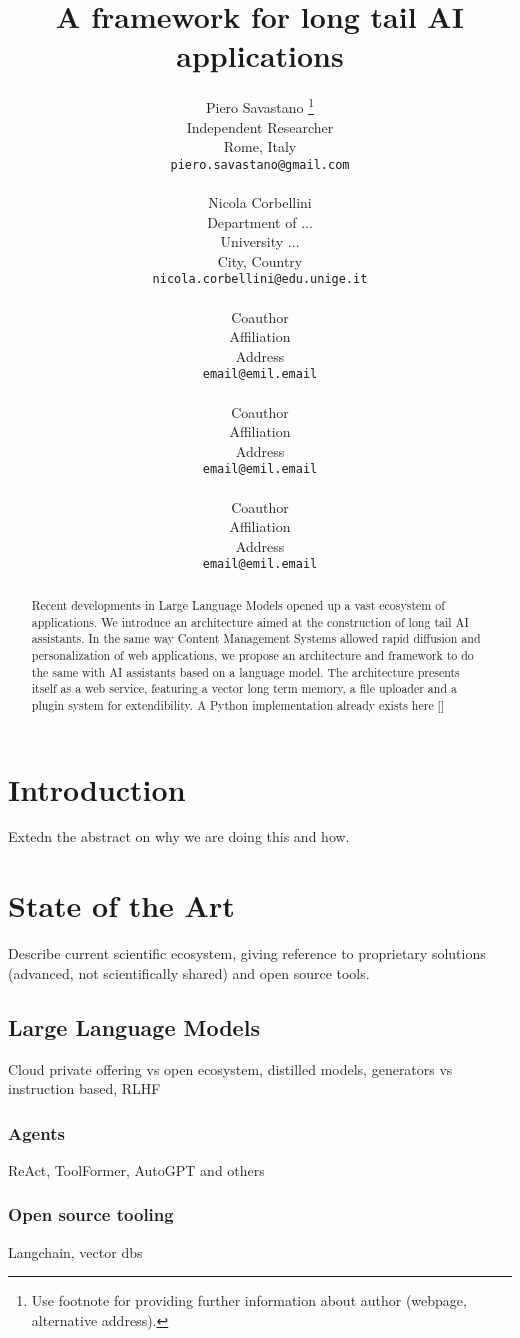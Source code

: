 \documentclass{article}
\title{A framework for long tail AI applications}
\author{

Piero Savastano \thanks{Use footnote for providing further information about author (webpage, alternative address).} \\
Independent Researcher\\
Rome, Italy\\
\texttt{piero.savastano@gmail.com}\\
	
\And
	
Nicola Corbellini \\
Department of ...\\
University ...\\
City, Country \\
\texttt{nicola.corbellini@edu.unige.it} \\

\And

Coauthor \\
Affiliation \\
Address \\
\texttt{email@emil.email} \\

\And

Coauthor \\
Affiliation \\
Address \\
\texttt{email@emil.email} \\

\And

Coauthor \\
Affiliation \\
Address \\
\texttt{email@emil.email} \\
	
}
\begin{document}
\maketitle

\begin{abstract}
Recent developments in Large Language Models opened up a vast ecosystem of applications. We introduce an architecture aimed at the construction of long tail AI assistants. In the same way Content Management Systems allowed rapid diffusion and personalization of web applications, we propose an architecture and framework to do the same with AI assistants based on a language model. The architecture presents itself as a web service, featuring a vector long term memory, a file uploader and a plugin system for extendibility.
A Python implementation already exists here []
\end{abstract}




\section{Introduction}
Extedn the abstract on why we are doing this and how.


\section{State of the Art}
Describe current scientific ecosystem, giving reference to proprietary solutions (advanced, not scientifically shared) and open source tools.

\subsection{Large Language Models}
Cloud private offering vs open ecosystem, distilled models, generators vs instruction based, RLHF

\subsubsection{Agents}
ReAct, ToolFormer, AutoGPT and others

\subsubsection{Open source tooling}
Langchain, vector dbs
\end{document}
